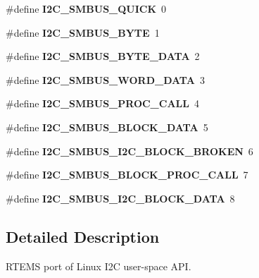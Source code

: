 \begin{DoxyCompactItemize}
\item 
\mbox{\label{group__I2CLinux_ga94760c9e3bb58f5535578eb52a0ffc0c}} 
\#define {\bfseries I2\+C\+\_\+\+S\+M\+B\+U\+S\+\_\+\+Q\+U\+I\+CK}~0
\item 
\mbox{\label{group__I2CLinux_ga8006fa66a9d9224959fb8337a365a12a}} 
\#define {\bfseries I2\+C\+\_\+\+S\+M\+B\+U\+S\+\_\+\+B\+Y\+TE}~1
\item 
\mbox{\label{group__I2CLinux_ga3d7320d4d3f8b109344ee08feab0e533}} 
\#define {\bfseries I2\+C\+\_\+\+S\+M\+B\+U\+S\+\_\+\+B\+Y\+T\+E\+\_\+\+D\+A\+TA}~2
\item 
\mbox{\label{group__I2CLinux_gabd0ad56a944b1a95435d51cc54db36c4}} 
\#define {\bfseries I2\+C\+\_\+\+S\+M\+B\+U\+S\+\_\+\+W\+O\+R\+D\+\_\+\+D\+A\+TA}~3
\item 
\mbox{\label{group__I2CLinux_ga140bc92b58f10de5eb796ad71e8f0da2}} 
\#define {\bfseries I2\+C\+\_\+\+S\+M\+B\+U\+S\+\_\+\+P\+R\+O\+C\+\_\+\+C\+A\+LL}~4
\item 
\mbox{\label{group__I2CLinux_ga0253f81d1f2732492c1a05dc41094d12}} 
\#define {\bfseries I2\+C\+\_\+\+S\+M\+B\+U\+S\+\_\+\+B\+L\+O\+C\+K\+\_\+\+D\+A\+TA}~5
\item 
\mbox{\label{group__I2CLinux_ga36bcbcb9294695fddb8606a32cbedc9b}} 
\#define {\bfseries I2\+C\+\_\+\+S\+M\+B\+U\+S\+\_\+\+I2\+C\+\_\+\+B\+L\+O\+C\+K\+\_\+\+B\+R\+O\+K\+EN}~6
\item 
\mbox{\label{group__I2CLinux_ga187e1de23e9935885cdb94ee429a2eed}} 
\#define {\bfseries I2\+C\+\_\+\+S\+M\+B\+U\+S\+\_\+\+B\+L\+O\+C\+K\+\_\+\+P\+R\+O\+C\+\_\+\+C\+A\+LL}~7
\item 
\mbox{\label{group__I2CLinux_gaa5ecbb0ceaddcb905d68d366edfb026c}} 
\#define {\bfseries I2\+C\+\_\+\+S\+M\+B\+U\+S\+\_\+\+I2\+C\+\_\+\+B\+L\+O\+C\+K\+\_\+\+D\+A\+TA}~8
\end{DoxyCompactItemize}


\subsection{Detailed Description}
R\+T\+E\+MS port of Linux I2C user-\/space A\+PI. 

